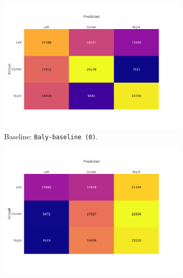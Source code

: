 \begin{figure}[!htbp]
    \centering
     \begin{subfigure}[b]{0.7\linewidth}
         \centering
         \includegraphics[trim={0 2cm 2cm 1cm},clip,width=\linewidth]{figures/nela_allsides_subset_media_balanced_confusion_matrix_bert.pdf}
         \caption{Baseline: \texttt{Baly-baseline (0)}.}
         \label{fig:nela_confusion_bert}
     \end{subfigure}
    \begin{subfigure}[b]{0.7\linewidth}
         \centering 
         \includegraphics[trim={0 2cm 2cm 1cm},clip,width=\linewidth]{figures/nela_allsides_subset_media_balanced_confusion_matrix_propaganda_techniques_tf_idf.pdf}

\end{subfigure}
\end{figure}

